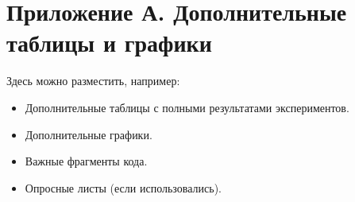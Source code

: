 \documentclass[a4paper,12pt]{article}
\begin{document}
\newpage

\section*{Приложение А. Дополнительные таблицы и графики}
\setcounter{section}{1}
\setcounter{table}{0}
\renewcommand{\thetable}{А.\arabic{table}}
\setcounter{figure}{0}
\renewcommand{\thefigure}{А.\arabic{figure}}

Здесь можно разместить, например:
\begin{itemize}
    \item Дополнительные таблицы с полными результатами экспериментов.
    \item Дополнительные графики.
    \item Важные фрагменты кода.
    \item Опросные листы (если использовались).
\end{itemize}
\end{document}
